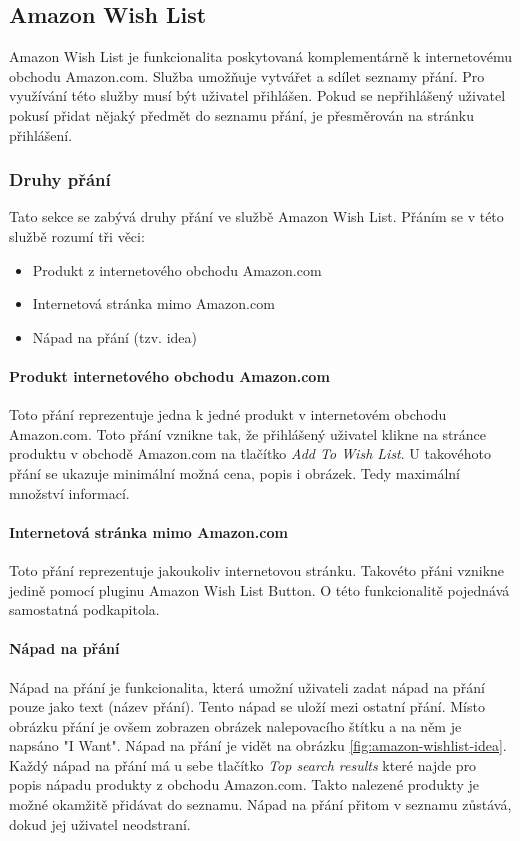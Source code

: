 \subsection{Amazon Wish List}
Amazon Wish List je funkcionalita poskytovaná komplementárně k internetovému obchodu Amazon.com. Služba umožňuje vytvářet a sdílet seznamy přání. Pro využívání této služby musí být uživatel přihlášen. Pokud se nepřihlášený uživatel pokusí přidat nějaký předmět do seznamu přání, je přesměrován na stránku přihlášení.

\subsubsection{Druhy přání}
Tato sekce se zabývá druhy přání ve službě Amazon Wish List. Přáním se v této službě rozumí tři věci:
\begin{itemize}
\item Produkt z internetového obchodu Amazon.com
\item Internetová stránka mimo Amazon.com
\item Nápad na přání (tzv. idea)
\end{itemize}

\paragraph{Produkt internetového obchodu Amazon.com}
\label{par:produkt-amazon}
Toto přání reprezentuje jedna k jedné produkt v internetovém obchodu Amazon.com. Toto přání vznikne tak, že přihlášený uživatel klikne na stránce produktu v obchodě Amazon.com na tlačítko \emph{Add To Wish List}. U takovéhoto přání se ukazuje minimální možná cena, popis i obrázek. Tedy maximální množství informací.

\paragraph{Internetová stránka mimo Amazon.com}
Toto přání reprezentuje jakoukoliv internetovou stránku. Takovéto přáni vznikne jedině pomocí pluginu Amazon Wish List Button. O této funkcionalitě pojednává samostatná podkapitola.

\paragraph{Nápad na přání}
Nápad na přání je funkcionalita, která umožní uživateli zadat nápad na přání pouze jako text (název přání). Tento nápad se uloží mezi ostatní přání. Místo obrázku přání je ovšem zobrazen obrázek nalepovacího štítku a na něm je napsáno "I Want". Nápad na přání je vidět na obrázku \ref{fig:amazon-wishlist-idea}. Každý nápad na přání má u sebe tlačítko \emph{Top search results} které najde pro popis nápadu produkty z obchodu Amazon.com. Takto nalezené produkty je možné okamžitě přidávat do seznamu. Nápad na přání přitom v seznamu zůstává, dokud jej uživatel neodstraní.

